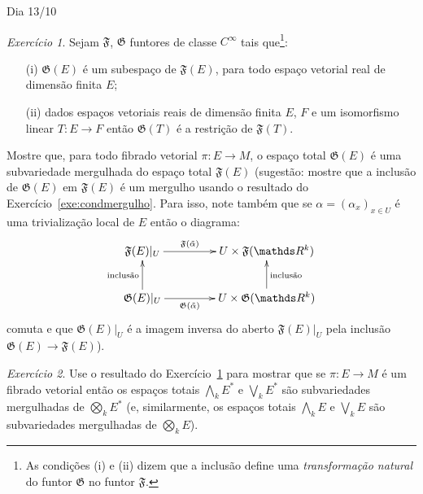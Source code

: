 \documentclass[oneside,11pt]{amsart}
\newcommand{\R}{\mathds R}
\theoremstyle{remark}\newtheorem{exercise}{Exercício}[section]
\theoremstyle{plain}\newtheorem{teo}{Teorema}[section]
\theoremstyle{plain}\newtheorem{lem}[teo]{Lema}
\theoremstyle{plain}\newtheorem{prop}[teo]{Proposição}
\theoremstyle{definition}\newtheorem{defin}[teo]{Definição}
\theoremstyle{remark}\newtheorem{rem}[teo]{Observação}
\theoremstyle{definition}\newtheorem{example}[teo]{Exemplo}
\numberwithin{equation}{section}
\begin{document}
\begin{section}{Dia 13/10}
\begin{exercise}\label{exe:funtorincfuntor}
Sejam $\mathfrak F$, $\mathfrak G$ funtores de classe $C^\infty$ tais que\footnote{%
As condições (i) e (ii) dizem que a inclusão define uma {\em transformação natural\/} do funtor $\mathfrak G$ no funtor $\mathfrak F$.}:
\begin{itemize}
\item[(i)] $\mathfrak G(E)$ é um subespaço de $\mathfrak F(E)$, para todo espaço vetorial real de dimensão finita $E$;
\item[(ii)] dados espaços vetoriais reais de dimensão finita $E$, $F$ e um isomorfismo linear $T:E\to F$ então $\mathfrak G(T)$ é a restrição
de $\mathfrak F(T)$.
\end{itemize}
Mostre que, para todo fibrado vetorial $\pi:E\to M$, o espaço total $\mathfrak G(E)$ é uma subvariedade mergulhada do espaço total $\mathfrak F(E)$
(sugestão: mostre que a inclusão de $\mathfrak G(E)$ em $\mathfrak F(E)$ é um mergulho usando o resultado do Exercício~\ref{exe:condmergulho}.
Para isso, note também que se $\alpha=(\alpha_x)_{x\in U}$ é uma trivialização local de $E$ então o diagrama:
\[\xymatrix@C+20pt{%
\mathfrak F(E)\vert_U\ar[r]^-{\mathfrak F(\tilde\alpha)}&U\times\mathfrak F(\R^k)\\
\mathfrak G(E)\vert_U\ar[u]^{\text{inclusão}}\ar[r]_-{\mathfrak G(\tilde\alpha)}&U\times\mathfrak G(\R^k)\ar[u]_{\text{inclusão}}}\]
comuta e que $\mathfrak G(E)\vert_U$ é a imagem inversa do aberto $\mathfrak F(E)\vert_U$ pela inclusão $\mathfrak G(E)\to\mathfrak F(E)$).
\end{exercise}

\begin{exercise}\label{exe:espacototalmerg}
Use o resultado do Exercício~\ref{exe:funtorincfuntor} para mostrar que se $\pi:E\to M$ é um fibrado vetorial então os espaços totais
$\bigwedge_kE^*$ e $\bigvee_kE^*$ são subvariedades mergulhadas de $\bigotimes_kE^*$ (e, similarmente, os espaços totais
$\bigwedge_kE$ e $\bigvee_kE$ são subvariedades mergulhadas de $\bigotimes_kE$).
\end{exercise}

\end{section}
\end{document}
